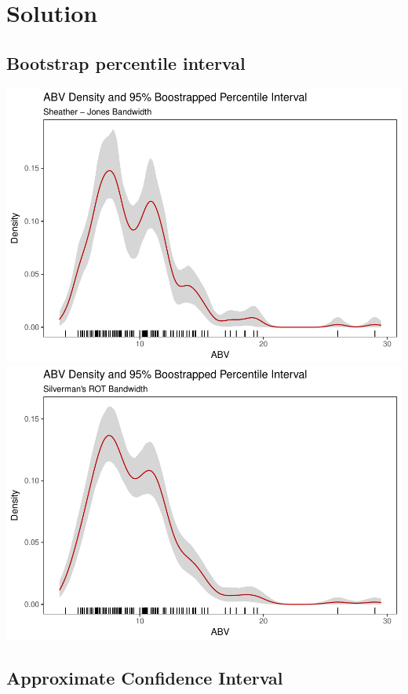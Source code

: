 \documentclass[]{article}
\begin{document}
\section{Solution}\label{solution}

\subsection{Bootstrap percentile
interval}\label{bootstrap-percentile-interval}

\includegraphics{FinalReport_files/figure-latex/unnamed-chunk-13-1.pdf}
\includegraphics{FinalReport_files/figure-latex/unnamed-chunk-13-2.pdf}

\subsection{Approximate Confidence
Interval}\label{approximate-confidence-interval}
\end{document}
